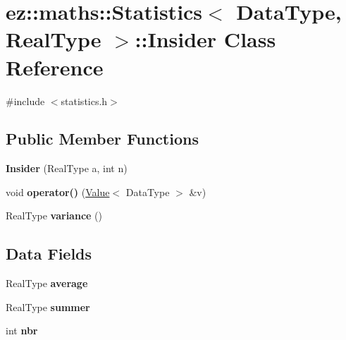 \hypertarget{classez_1_1maths_1_1Statistics_1_1Insider}{}\section{ez\+:\+:maths\+:\+:Statistics$<$ Data\+Type, Real\+Type $>$\+:\+:Insider Class Reference}
\label{classez_1_1maths_1_1Statistics_1_1Insider}


{\ttfamily \#include $<$statistics.\+h$>$}

\subsection*{Public Member Functions}
\begin{DoxyCompactItemize}
\item 
\mbox{\label{classez_1_1maths_1_1Statistics_1_1Insider_a56235effe84a9364c431fc13c0bd90a5}} 
{\bfseries Insider} (Real\+Type a, int n)
\item 
\mbox{\label{classez_1_1maths_1_1Statistics_1_1Insider_a4b6001e8fb3fee1d1472d8df19e786aa}} 
void {\bfseries operator()} (\hyperlink{classez_1_1maths_1_1Value}{Value}$<$ Data\+Type $>$ \&v)
\item 
\mbox{\label{classez_1_1maths_1_1Statistics_1_1Insider_a945954d3e6e791f5c41907a93dcd2611}} 
Real\+Type {\bfseries variance} ()
\end{DoxyCompactItemize}
\subsection*{Data Fields}
\begin{DoxyCompactItemize}
\item 
\mbox{\label{classez_1_1maths_1_1Statistics_1_1Insider_aebc08c9106ea526a19f43bc485b898e8}} 
Real\+Type {\bfseries average}
\item 
\mbox{\label{classez_1_1maths_1_1Statistics_1_1Insider_a305fe80d595c1e1fc4158de8f192e3b6}} 
Real\+Type {\bfseries summer}
\item 
\mbox{\label{classez_1_1maths_1_1Statistics_1_1Insider_a01439b41375dca90b7700fb030091e3e}} 
int {\bfseries nbr}
\end{DoxyCompactItemize}


